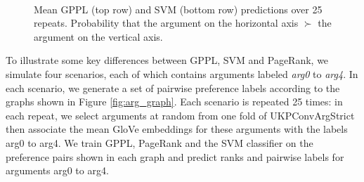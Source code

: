 \begin{figure}
{}
\\[-12pt]
\caption{Mean GPPL (top row) and SVM (bottom row) predictions over 25 repeats. Probability that the argument 
on the horizontal axis $\succ$ the argument on the vertical axis.}
\label{fig:cycle_demo_classification}
\end{figure}

To illustrate some key differences between GPPL, SVM and PageRank,
we simulate four scenarios, each of which contains arguments labeled \emph{arg0} to \emph{arg4}.  
In each scenario, we generate a set of pairwise preference labels according to the 
graphs shown in Figure \ref{fig:arg_graph}.
Each scenario is repeated 25 times: in each repeat, we select arguments at random from one fold of UKPConvArgStrict
then associate the mean GloVe embeddings for these arguments with the labels arg0 to arg4. 
We train GPPL, PageRank and the SVM classifier on the preference pairs shown in each graph and
predict ranks and pairwise labels for arguments arg0 to arg4.

